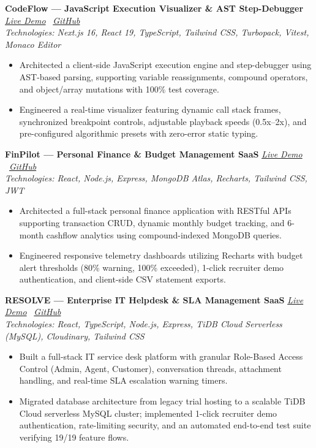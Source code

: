 \documentclass[a4paper,10pt]{article}
\begin{document}
\textbf{CodeFlow — JavaScript Execution Visualizer \& AST Step-Debugger} \hfill \href{https://codeflow-javascript-debugger.vercel.app/}{\textit{Live Demo}} \textbar \ \href{https://github.com/DikshJaswal/codeflow-javascript-debugger}{\textit{GitHub}}\\
\textit{Technologies: Next.js 16, React 19, TypeScript, Tailwind CSS, Turbopack, Vitest, Monaco Editor}
\begin{itemize}
    \item Architected a client-side JavaScript execution engine and step-debugger using AST-based parsing, supporting variable reassignments, compound operators, and object/array mutations with 100\% test coverage.
    \item Engineered a real-time visualizer featuring dynamic call stack frames, synchronized breakpoint controls, adjustable playback speeds (0.5x--2x), and pre-configured algorithmic presets with zero-error static typing.
\end{itemize}

\textbf{FinPilot — Personal Finance \& Budget Management SaaS} \hfill \href{https://fin-pilot-zeta-dun.vercel.app/}{\textit{Live Demo}} \textbar \ \href{https://github.com/DikshJaswal/FinPilot}{\textit{GitHub}}\\
\textit{Technologies: React, Node.js, Express, MongoDB Atlas, Recharts, Tailwind CSS, JWT}
\begin{itemize}
    \item Architected a full-stack personal finance application with RESTful APIs supporting transaction CRUD, dynamic monthly budget tracking, and 6-month cashflow analytics using compound-indexed MongoDB queries.
    \item Engineered responsive telemetry dashboards utilizing Recharts with budget alert thresholds (80\% warning, 100\% exceeded), 1-click recruiter demo authentication, and client-side CSV statement exports.
\end{itemize}

\textbf{RESOLVE — Enterprise IT Helpdesk \& SLA Management SaaS} \hfill \href{https://resolve-pink-eight.vercel.app/}{\textit{Live Demo}} \textbar \ \href{https://github.com/DikshJaswal/RESOLVE}{\textit{GitHub}}\\
\textit{Technologies: React, TypeScript, Node.js, Express, TiDB Cloud Serverless (MySQL), Cloudinary, Tailwind CSS}
\begin{itemize}
    \item Built a full-stack IT service desk platform with granular Role-Based Access Control (Admin, Agent, Customer), conversation threads, attachment handling, and real-time SLA escalation warning timers.
    \item Migrated database architecture from legacy trial hosting to a scalable TiDB Cloud serverless MySQL cluster; implemented 1-click recruiter demo authentication, rate-limiting security, and an automated end-to-end test suite verifying 19/19 feature flows.
\end{itemize}
\end{document}

